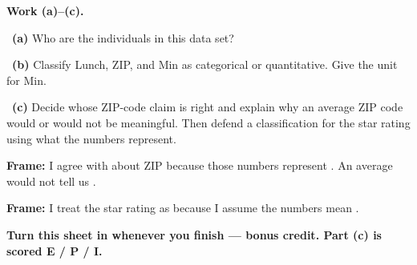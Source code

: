 \documentclass[11pt]{article}
\begin{document}
\newpage
\textbf{Work (a)--(c).}\par\smallskip

~\textbf{(a)} Who are the individuals in this data set?\par
\workspace{0.8in}

~\textbf{(b)} Classify Lunch, ZIP, and Min as categorical or quantitative. Give the unit for Min.\par
\workspace{1.3in}

~\textbf{(c)} Decide whose ZIP-code claim is right and explain why an average ZIP code would or would not be meaningful. Then defend a classification for the star rating using what the numbers represent.\par
\workspace{1.9in}

\begin{sentenceframebox}\raggedright\textbf{Frame:} I agree with \blank[0.8in] about ZIP because those numbers represent \blank[1.8in]. An average would not tell us \blank[1.8in].\end{sentenceframebox}

\begin{sentenceframebox}\raggedright\textbf{Frame:} I treat the star rating as \blank[1in] because I assume the numbers mean \blank[2in].\end{sentenceframebox}

\textbf{Turn this sheet in whenever you finish --- bonus credit. Part (c) is scored E / P / I.}\par

\end{document}
